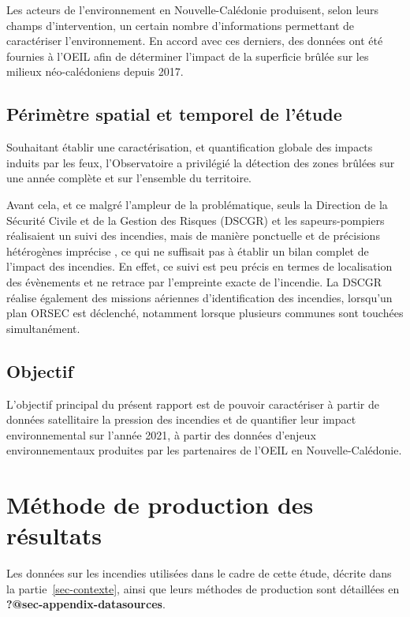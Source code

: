 \documentclass[
  11pt,
  letterpaper,
]{scrreprt}
\begin{document}
Les acteurs de l'environnement en Nouvelle-Calédonie produisent, selon
leurs champs d'intervention, un certain nombre d'informations permettant
de caractériser l'environnement. En accord avec ces derniers, des
données ont été fournies à l'OEIL afin de déterminer l'impact de la
superficie brûlée sur les milieux néo-calédoniens depuis 2017.

\section{Périmètre spatial et temporel de
l'étude}\label{puxe9rimuxe8tre-spatial-et-temporel-de-luxe9tude}

Souhaitant établir une caractérisation, et quantification globale des
impacts induits par les feux, l'Observatoire a privilégié la détection
des zones brûlées sur une année complète et sur l'ensemble du
territoire.

Avant cela, et ce malgré l'ampleur de la problématique, seuls la
Direction de la Sécurité Civile et de la Gestion des Risques (DSCGR) et
les sapeurs-pompiers réalisaient un suivi des incendies, mais de manière
ponctuelle et de précisions hétérogènes imprécise , ce qui ne suffisait
pas à établir un bilan complet de l'impact des incendies. En effet, ce
suivi est peu précis en termes de localisation des évènements et ne
retrace par l'empreinte exacte de l'incendie. La DSCGR réalise également
des missions aériennes d'identification des incendies, lorsqu'un plan
ORSEC est déclenché, notamment lorsque plusieurs communes sont touchées
simultanément.

\section{Objectif}\label{objectif-1}

L'objectif principal du présent rapport est de pouvoir caractériser à
partir de données satellitaire la pression des incendies et de
quantifier leur impact environnemental sur l'année 2021, à partir des
données d'enjeux environnementaux produites par les partenaires de
l'OEIL en Nouvelle-Calédonie.


\chapter{Méthode de production des
résultats}\label{muxe9thode-de-production-des-ruxe9sultats}

Les données sur les incendies utilisées dans le cadre de cette étude,
décrite dans la partie~\ref{sec-contexte}, ainsi que leurs méthodes de
production sont détaillées en \textbf{?@sec-appendix-datasources}.
\end{document}
